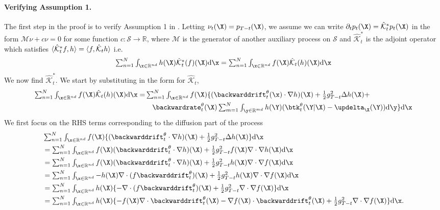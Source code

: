 \paragraph{Verifying Assumption 1.} The first step in the proof is to verify Assumption 1 in
\cite{benton2022denoising}. Letting $\nu_t(\X) = p_{T-t}(\X)$, we assume we can
write $\partial_t p_t (\X) = \hat{\mathcal{K}}_t^* p_t(\X)$ in the form
$\mathcal{M}\nu + c \nu = 0$ for some function
$c : \mathcal{S} \rightarrow \mathbb{R}$, where $\mathcal{M}$ is the generator
of another auxiliary process on $\mathcal{S}$ and $\hat{\mathcal{K}}_t^*$ is the
adjoint operator which satisfies
$\langle \hat{\mathcal{K}}^*_t f, h \rangle = \langle f, \hat{\mathcal{K}}_t h \rangle$ i.e.
\begin{equation}
  \textstyle   \intx h(\X) \hat{\mathcal{K}}_t^*(f)(\X) \rmd \x = \intx f(\X) \hat{\mathcal{K}}_t(h)(\X) \rmd \x
\end{equation}
We now find $\hat{\mathcal{K}}_t^*$. We start by substituting in the form for $\hat{\mathcal{K}}_t$,
\begin{align}
    \textstyle \intx f(\X) \hat{\mathcal{K}}_t(h)(\X) \rmd \x =&\textstyle \intx f(\X) \{ (\backwarddrift_t^\theta(\x) \cdot \nabla h)(\X) + \frac{1}{2} g_{T-t}^2 \Delta h (\X) + \\
    & \quad \textstyle \backwardrate_t^\theta(\X) \inty h(\Y) ( \btk_t^\theta(\Y | \X) - \updelta_{\X}(\Y) ) \rmd\y \} \rmd \x 
\end{align}
We first focus on the RHS terms corresponding to the diffusion part of the process
\begin{align}
  &\textstyle \intx f(\X) \{ (\backwarddrift_t^\theta \cdot \nabla h)(\X) + \frac{1}{2} g_{T-t}^2 \Delta h (\X) \} \rmd \x\\
  &\textstyle = \intx f(\X) (\backwarddrift_t^\theta \cdot \nabla h)(\X) + \frac{1}{2} g_{T-t}^2 f(\X) \nabla \cdot \nabla h (\X) \rmd \x\\
  &\textstyle = \intx f(\X) (\backwarddrift_t^\theta \cdot \nabla h)(\X) + \frac{1}{2} g_{T-t}^2 h(\X) \nabla \cdot \nabla f (\X) \rmd \x\\
  &\textstyle = \intx  -h (\X) \nabla \cdot ( f \backwarddrift_t^\theta)(\X) + \frac{1}{2} g_{T-t}^2 h(\X) \nabla \cdot \nabla f (\X) \rmd \x\\
  &\textstyle = \intx  h (\X) \{ - \nabla \cdot ( f \backwarddrift_t^\theta)(\X) + \frac{1}{2} g_{T-t}^2 \nabla \cdot \nabla f (\X) \} \rmd \x\\
  &\textstyle = \intx  h (\X) \{ -f(\X) \nabla \cdot \backwarddrift_t^\theta(\X) - \nabla f(\X) \cdot \backwarddrift_t^\theta(\X) + \frac{1}{2} g_{T-t}^2 \nabla \cdot \nabla f (\X) \} \rmd \x .
\end{align}
